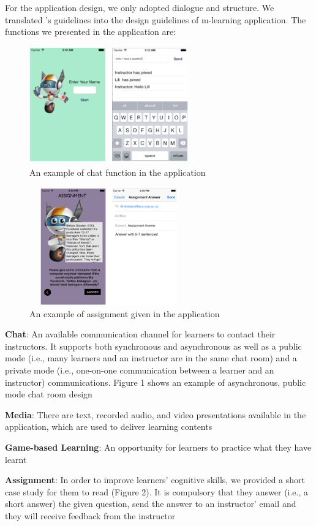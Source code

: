\documentclass[a4paper,twoside]{article}
\begin{document}
For the application design, we only adopted dialogue and structure. We translated \citet{moore1973toward}'s guidelines into the design guidelines of m-learning application. The functions we presented in the application are: 
\begin{figure}
\centering
\includegraphics[height=2.0in, width=2.7in]{fig1}
\caption{An example of chat function in the application}
\end{figure}

\begin{figure}
\centering
\includegraphics[height=2.0in, width=2.7in]{fig2}
\caption{An example of assignment given in the application}
\end{figure}

\begin{enumerate}
\item{\textbf{Chat}: An available communication channel for learners to contact their instructors. It supports both synchronous and asynchronous as well as a public mode (i.e., many learners and an instructor are in the same chat room) and a private mode (i.e., one-on-one communication between a learner and an instructor) communications. Figure 1 shows an example of asynchronous, public mode chat room design}
\item{\textbf{Media}: There are text, recorded audio, and video presentations available in the application, which are used to deliver learning contents
\item{\textbf{Game-based Learning}: An opportunity for learners to practice what they have learnt}
\item{\textbf{Assignment}: In order to improve learners' cognitive skills, we provided a short case study for them to read (Figure 2). It is compulsory that they answer (i.e., a short answer) the given question, send the answer to an instructor' email and they will receive feedback from the instructor}
}
\end{enumerate}
\end{document}
